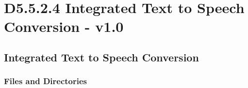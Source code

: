 \documentclass{CSSRforAfrica}
\begin{document}
  
%  



\section{D5.5.2.4 Integrated Text to Speech Conversion - v1.0}

\subsection{Integrated Text to Speech Conversion}

\subsubsection{Files and Directories}
\end{document}
